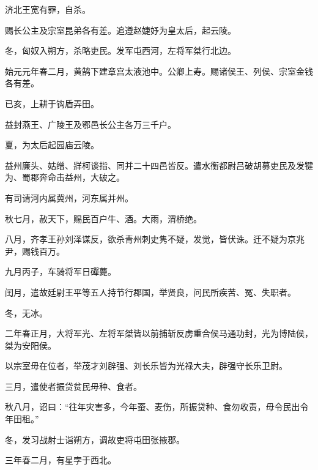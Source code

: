 \documentclass[12pt,UTF8]{ctexbook}
\begin{document}
济北王宽有罪，自杀。



赐长公主及宗室昆弟各有差。追遵赵婕妤为皇太后，起云陵。



冬，匈奴入朔方，杀略吏民。发军屯西河，左将军桀行北边。



始元元年春二月，黄鹄下建章宫太液池中。公卿上寿。赐诸侯王、列侯、宗室金钱各有差。



已亥，上耕于钩盾弄田。



益封燕王、广陵王及鄂邑长公主各万三千户。



夏，为太后起园庙云陵。



益州廉头、姑缯、牂柯谈指、同并二十四邑皆反。遣水衡都尉吕破胡募吏民及发犍为、蜀郡奔命击益州，大破之。



有司请河内属冀州，河东属并州。



秋七月，赦天下，赐民百户牛、酒。大雨，渭桥绝。



八月，齐孝王孙刘泽谋反，欲杀青州刺史隽不疑，发觉，皆伏诛。迁不疑为京兆尹，赐钱百万。



九月丙子，车骑将军日磾薨。



闰月，遣故廷尉王平等五人持节行郡国，举贤良，问民所疾苦、冤、失职者。



冬，无冰。



二年春正月，大将军光、左将军桀皆以前捕斩反虏重合侯马通功封，光为博陆侯，桀为安阳侯。



以宗室毋在位者，举茂才刘辟强、刘长乐皆为光禄大夫，辟强守长乐卫尉。



三月，遣使者振贷贫民毋种、食者。



秋八月，诏曰：“往年灾害多，今年蚕、麦伤，所振贷种、食勿收责，毋令民出令年田租。”



冬，发习战射士诣朔方，调故吏将屯田张掖郡。



三年春二月，有星孛于西北。
\end{document}
